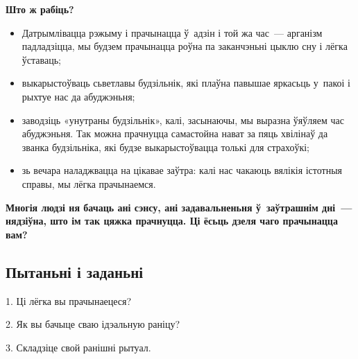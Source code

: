 \textbf{Што ж рабіць?}
\begin{itemize}
  \item Датрымлівацца рэжыму і прачынацца ў~адзін і той жа час~--- арганізм падладзіцца, мы будзем прачынацца роўна па заканчэньні цыклю сну і лёгка ўставаць;
  \item выкарыстоўваць сьветлавы будзільнік, які плаўна павышае яркасьць у~пакоі і рыхтуе нас да абуджэньня;
  \item заводзіць «унутраны будзільнік», калі, засынаючы, мы выразна ўяўляем час абуджэньня. Так можна прачнуцца самастойна нават за пяць хвілінаў да званка будзільніка, які будзе выкарыстоўвацца толькі для страхоўкі;
  \item зь вечара наладжвацца на цікавае заўтра: калі нас чакаюць вялікія істотныя справы, мы лёгка прачынаемся.
\end{itemize}

\textbf{Многія людзі ня бачаць ані сэнсу, ані задавальненьня ў~заўтрашнім дні~--- нядзіўна, што ім так цяжка прачнуцца. Ці ёсьць дзеля чаго прачынацца вам?}

\subsection*{Пытаньні і заданьні}

1. Ці лёгка вы прачынаецеся?

2. Як вы бачыце сваю ідэальную раніцу?

3. Складзіце свой ранішні рытуал.


